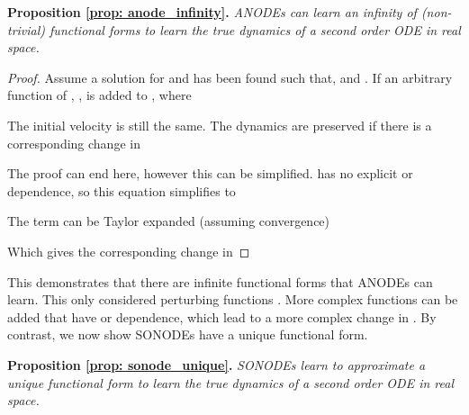 \documentclass{article}
\theoremstyle{remark}
\theoremstyle{definition}
\begin{document}
\textbf{Proposition \ref{prop: anode_infinity}.} \textit{ANODEs can learn an infinity of (non-trivial) functional forms to learn the true dynamics of a second order ODE in real space.}

\begin{proof}
Assume a solution for  and  has been found such that,  and . If an arbitrary function of , , is added to , where 

The initial velocity is still the same. The dynamics are preserved if there is a corresponding change in 

The proof can end here, however this can be simplified.  has no explicit  or  dependence, so this equation simplifies to

The term  can be Taylor expanded (assuming convergence)



Which gives the corresponding change in 

\end{proof}

This demonstrates that there are infinite functional forms that ANODEs can learn. This only considered perturbing functions . More complex functions can be added that have  or  dependence, which lead to a more complex change in . By contrast, we now show SONODEs have a unique functional form.

\textbf{Proposition \ref{prop: sonode_unique}.} \textit{SONODEs learn to approximate a unique functional form to learn the true dynamics of a second order ODE in real space.}
\end{document}
